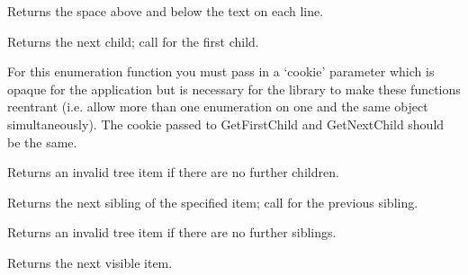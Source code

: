 Returns the space above and below the text on each line.

\label{wxtreelistctrlgetnextchild}


Returns the next child; call  for the first child.

For this enumeration function you must pass in a `cookie' parameter
which is opaque for the application but is necessary for the library
to make these functions reentrant (i.e. allow more than one
enumeration on one and the same object simultaneously). The cookie passed to
GetFirstChild and GetNextChild should be the same.

Returns an invalid tree item if there are no further children.





\label{wxtreelistctrlgetnextsibling}


Returns the next sibling of the specified item; call  for the previous sibling.

Returns an invalid tree item if there are no further siblings.



\label{wxtreelistctrlgetnextvisible}


Returns the next visible item.

\label{wxtreelistctrlgetitemparent}

